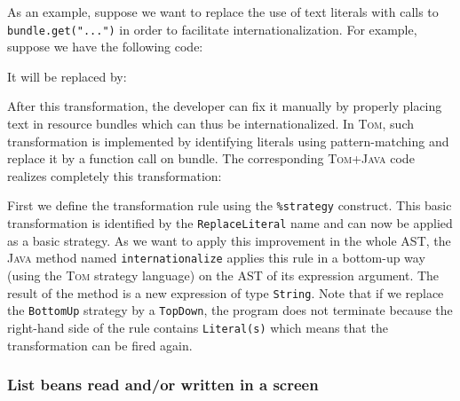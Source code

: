 \documentclass[runningheads]{llncs}
\newcommand{\tom}{\textsc{Tom}}
\newcommand{\java}{\textsc{Java}}
\begin{document}
As an example, suppose we want to replace the use of text literals with calls
to \verb+bundle.get("...")+ in order to facilitate internationalization. For
example, suppose we have the following code:


It will be replaced by:

\begin{el}
${cars.getRowCount()} ${bundle.get("Cars' total price"}} =
    $ ${cars.getTotalPrice()}
\end{el}

After this transformation, the developer can fix it manually by properly
placing text in resource bundles which can thus be internationalized.
In {\tom}, such transformation is implemented by identifying literals using
pattern-matching and replace it by a function call on bundle. The corresponding
{\tom}+{\java} code realizes completely this transformation:


First we define the transformation rule using the \verb+%strategy+ construct.
This basic transformation is identified by the \texttt{ReplaceLiteral} name and
can now be applied as a basic strategy. As we want to apply this improvement in
the whole AST, the {\java} method named \texttt{internationalize} applies this
rule in a bottom-up way (using the {\tom} strategy language) on the AST of its
expression argument. The result of the method is a new expression of type
\texttt{String}. Note that if we replace the \verb+BottomUp+ strategy by a
\verb+TopDown+, the program does not terminate because the right-hand side of
the rule contains \verb+Literal(s)+ which means that the transformation can be
fired again.

\subsubsection{List beans read and/or written in a screen}
\end{document}
